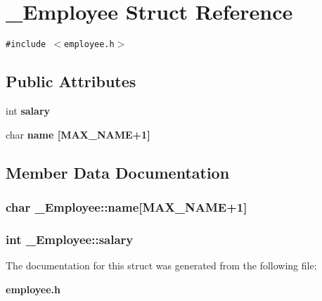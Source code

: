 \section{\_\-Employee Struct Reference}
\label{struct__Employee}
{\tt \#include $<$employee.h$>$}

\subsection*{Public Attributes}
\begin{CompactItemize}
\item 
int \bf{salary}
\item 
char \bf{name} [MAX\_\-NAME+1]
\end{CompactItemize}


\subsection{Member Data Documentation}
\subsubsection{\setlength{\rightskip}{0pt plus 5cm}char \bf{\_\-Employee::name}[MAX\_\-NAME+1]}\label{struct__Employee_99e96c306c0245947184255cd20aac27}


\subsubsection{\setlength{\rightskip}{0pt plus 5cm}int \bf{\_\-Employee::salary}}\label{struct__Employee_c326f9bd5d7647060effee3af87a8ed5}




The documentation for this struct was generated from the following file:\begin{CompactItemize}
\item 
\bf{employee.h}\end{CompactItemize}
